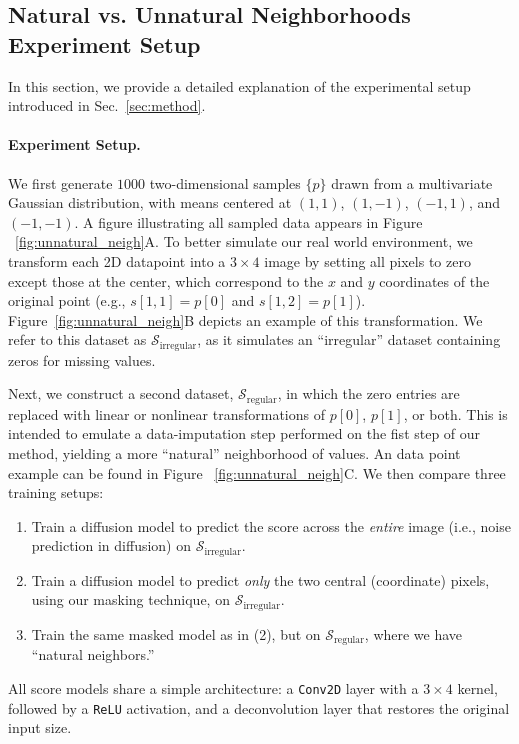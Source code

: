 \documentclass{article}
\theoremstyle{plain}
\theoremstyle{definition}
\theoremstyle{remark}
\begin{document}
\clearpage

\subsection{Natural vs. Unnatural Neighborhoods Experiment Setup}
\label{sec:natural_vs_unnatural}

In this section, we provide a detailed explanation of the experimental setup introduced in Sec.~\ref{sec:method}.

\paragraph{Experiment Setup.}
We first generate $1000$ two-dimensional samples $\{p\}$ drawn from a multivariate Gaussian distribution, with means centered at $(1,1)$, $(1,-1)$, $(-1,1)$, and $(-1,-1)$. A figure illustrating all sampled data appears in Figure ~\ref{fig:unnatural_neigh}A. To better simulate our real world environment, we transform each 2D datapoint into a $3 \times 4$ image by setting all pixels to zero except those at the center, which correspond to the $x$ and $y$ coordinates of the original point (e.g., $s[1,1] = p[0]$ and $s[1,2] = p[1]$). Figure~\ref{fig:unnatural_neigh}B depicts an example of this transformation. We refer to this dataset as $\mathcal{S}_{\mathrm{irregular}}$, as it simulates an ``irregular'' dataset containing zeros for missing values.


Next, we construct a second dataset, $\mathcal{S}_{\mathrm{regular}}$, in which the zero entries are replaced with linear or nonlinear transformations of $p[0]$, $p[1]$, or both. This is intended to emulate a data-imputation step performed on the fist step of our method, yielding a more ``natural'' neighborhood of values. An data point example can be found in Figure ~\ref{fig:unnatural_neigh}C.
We then compare three training setups:
\begin{enumerate}
    \item Train a diffusion model to predict the score across the \emph{entire} image (i.e., noise prediction in diffusion) on $\mathcal{S}_{\mathrm{irregular}}$.
    \item Train a diffusion model to predict \emph{only} the two central (coordinate) pixels, using our masking technique, on $\mathcal{S}_{\mathrm{irregular}}$.
    \item Train the same masked model as in (2), but on $\mathcal{S}_{\mathrm{regular}}$, where we have ``natural neighbors.''
\end{enumerate}
All score models share a simple architecture: a \texttt{Conv2D} layer with a $3\times 4$ kernel, followed by a \texttt{ReLU} activation, and a deconvolution layer that restores the original input size.
\end{document}
